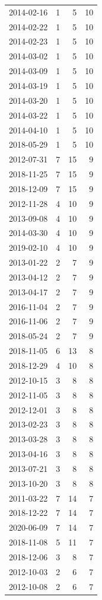 \begin{tabular}{lrrr}
2014-02-16 & 1 & 5 & 10 \\
2014-02-22 & 1 & 5 & 10 \\
2014-02-23 & 1 & 5 & 10 \\
2014-03-02 & 1 & 5 & 10 \\
2014-03-09 & 1 & 5 & 10 \\
2014-03-19 & 1 & 5 & 10 \\
2014-03-20 & 1 & 5 & 10 \\
2014-03-22 & 1 & 5 & 10 \\
2014-04-10 & 1 & 5 & 10 \\
2018-05-29 & 1 & 5 & 10 \\
2012-07-31 & 7 & 15 & 9 \\
2018-11-25 & 7 & 15 & 9 \\
2018-12-09 & 7 & 15 & 9 \\
2012-11-28 & 4 & 10 & 9 \\
2013-09-08 & 4 & 10 & 9 \\
2014-03-30 & 4 & 10 & 9 \\
2019-02-10 & 4 & 10 & 9 \\
2013-01-22 & 2 & 7 & 9 \\
2013-04-12 & 2 & 7 & 9 \\
2013-04-17 & 2 & 7 & 9 \\
2016-11-04 & 2 & 7 & 9 \\
2016-11-06 & 2 & 7 & 9 \\
2018-05-24 & 2 & 7 & 9 \\
2018-11-05 & 6 & 13 & 8 \\
2018-12-29 & 4 & 10 & 8 \\
2012-10-15 & 3 & 8 & 8 \\
2012-11-05 & 3 & 8 & 8 \\
2012-12-01 & 3 & 8 & 8 \\
2013-02-23 & 3 & 8 & 8 \\
2013-03-28 & 3 & 8 & 8 \\
2013-04-16 & 3 & 8 & 8 \\
2013-07-21 & 3 & 8 & 8 \\
2013-10-20 & 3 & 8 & 8 \\
2011-03-22 & 7 & 14 & 7 \\
2018-12-22 & 7 & 14 & 7 \\
2020-06-09 & 7 & 14 & 7 \\
2018-11-08 & 5 & 11 & 7 \\
2018-12-06 & 3 & 8 & 7 \\
2012-10-03 & 2 & 6 & 7 \\
2012-10-08 & 2 & 6 & 7 \\

\end{tabular}
